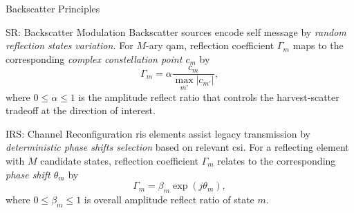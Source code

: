 \documentclass[journal]{IEEEtran}
\begin{document}
\begin{section}{Backscatter Principles}
	\begin{subsection}{SR: Backscatter Modulation}
		Backscatter sources encode self message by \emph{random reflection states variation.} For $M$-ary \gls{qam}, reflection coefficient $\Gamma_m$ maps to the corresponding \emph{complex constellation point $c_m$} by \cite{Thomas2012a}
		\begin{equation}
			\Gamma_m = \alpha \frac{c_m}{\max_{m'} \lvert c_{m'} \rvert},
			\label{eq:backscatter_modulation}
		\end{equation}
		where $0 \le \alpha \le 1$ is the amplitude reflect ratio that controls the harvest-scatter tradeoff at the direction of interest.

	\end{subsection}

	\begin{subsection}{IRS: Channel Reconfiguration}
		\gls{ris} elements assist legacy transmission by \emph{deterministic phase shifts selection} based on relevant \gls{csi}.
		For a reflecting element with $M$ candidate states, reflection coefficient $\Gamma_m$ relates to the corresponding \emph{phase shift $\theta_m$} by \cite{Wu2018}
		\begin{equation}
			\Gamma_m = \beta_m \exp(j \theta_m),
		\end{equation}
		where $0 \le \beta_m \le 1$ is overall amplitude reflect ratio of state $m$.
	\end{subsection}


\end{section}
\end{document}
